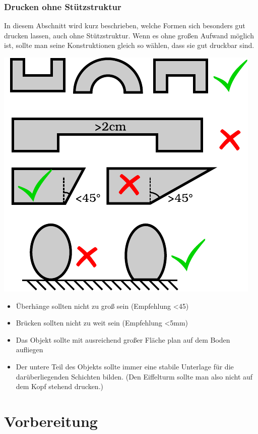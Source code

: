 \documentclass{\basedir/fablab-document}
\begin{document}
\subsubsection{Drucken ohne Stützstruktur}
In diesem Abschnitt wird kurz beschrieben, welche Formen sich besonders gut drucken lassen, auch ohne Stützstruktur. Wenn es ohne großen Aufwand möglich ist, sollte man seine Konstruktionen gleich so wählen, dass sie gut druckbar sind.
\begin{center}
\includegraphics{./zeichnungen/formen.pdf}
\end{center}
\begin{itemize}
\item Überhänge sollten nicht zu groß sein
(Empfehlung {\textless}45\textcelsius{})
\item Brücken sollten nicht zu weit sein (Empfehlung {\textless}5mm)
\item Das Objekt sollte mit ausreichend großer Fläche plan auf dem Boden aufliegen
\item Der untere Teil des Objekts sollte immer eine stabile Unterlage für die darüberliegenden Schichten bilden. (Den Eiffelturm sollte man also nicht auf dem Kopf stehend drucken.)
\end{itemize}
\newpage


\section{Vorbereitung}
\end{document}
